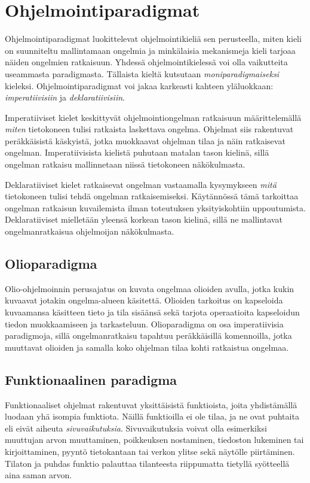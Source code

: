 \chapter{Ohjelmointiparadigmat} \label{Ohjelmointiparadigmat}
Ohjelmointiparadigmat luokittelevat ohjelmointikieliä sen perusteella, miten kieli on suunniteltu mallintamaan ongelmia ja minkälaisia mekanismeja kieli tarjoaa näiden ongelmien ratkaisuun. Yhdessä ohjelmointikielessä voi olla vaikutteita useammasta paradigmasta. Tällaista kieltä kutsutaan \textit{moniparadigmaiseksi} kieleksi. Ohjelmointiparadigmat voi jakaa karkeasti kahteen yläluokkaan: \textit{imperatiivisiin} ja \textit{deklaratiivisiin}.
\cite[Luku 6]{principlesAndParadigms}

Imperatiiviset kielet keskittyvät ohjelmointiongelman ratkaisuun määrittelemällä \textit{miten} tietokoneen tulisi ratkaista laskettava ongelma. Ohjelmat siis rakentuvat peräkkäisistä käskyistä, jotka muokkaavat ohjelman tilaa ja näin ratkaisevat ongelman. Imperatiivisista kielistä puhutaan matalan tason kielinä, sillä ongelman ratkaisu mallinnetaan niissä tietokoneen näkökulmasta.
\cite[Luku 1]{programmingLanguagePragmatics} 

Deklaratiiviset kielet ratkaisevat ongelman vastaamalla kysymykseen \textit{mitä} tietokoneen tulisi tehdä ongelman ratkaisemiseksi. Käytännössä tämä tarkoittaa ongelman ratkaisun kuvailemista ilman toteutuksen yksityiskohtiin uppoutumista. Deklaratiiviset mielletään yleensä korkean tason kielinä, sillä ne mallintavat ongelmanratkaisua ohjelmoijan näkökulmasta.
\cite[Luku 1]{programmingLanguagePragmatics}


\section{Olioparadigma}
Olio-ohjelmoinnin perusajatus on kuvata ongelmaa olioiden avulla, jotka kukin kuvaavat jotakin ongelma-alueen käsitettä. Olioiden tarkoitus on kapseloida kuvaamansa käsitteen tieto ja tila sisäänsä sekä tarjota operaatioita kapseloidun tiedon muokkaamiseen ja tarkasteluun. Olioparadigma on osa imperatiivisia paradigmoja, sillä ongelmanratkaisu tapahtuu peräkkäisillä komennoilla, jotka muuttavat olioiden ja samalla koko ohjelman tilaa kohti ratkaistua ongelmaa. \cite[Luku 1]{programmingLanguagePragmatics}
\cite[Luku 10]{principlesAndParadigms}


\section{Funktionaalinen paradigma}
Funktionaaliset ohjelmat rakentuvat yksittäisistä funktioista, joita yhdistämällä luodaan yhä isompia funktiota. Näillä funktioilla ei ole tilaa, ja ne ovat puhtaita eli eivät aiheuta \textit{sivuvaikutuksia}. Sivuvaikutuksia voivat olla esimerkiksi muuttujan arvon muuttaminen, poikkeuksen nostaminen, tiedoston lukeminen tai kirjoittaminen, pyyntö tietokantaan tai verkon ylitse sekä näytölle piirtäminen. Tilaton ja puhdas funktio palauttaa tilanteesta riippumatta tietyllä syötteellä aina saman arvon. \cite[Luku 1]{functionalProgrammingInScala}

